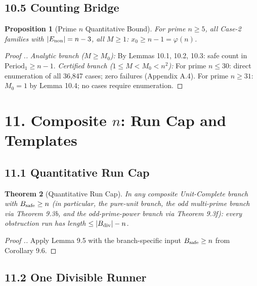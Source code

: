 \documentclass[11pt,a4paper]{article}
\theoremstyle{plain}
\newtheorem{theorem}{Theorem}[section]
\newtheorem{proposition}[theorem]{Proposition}
\theoremstyle{definition}
\theoremstyle{remark}
\begin{document}
\subsection{10.5 Counting Bridge}



\begin{proposition}[Prime $n$ Quantitative Bound]
For prime $n \geq 5$, all Case-2 families with $|E_{\rm non}|=n-3$, all $M \geq 1$: $x_0 \geq n-1 = \varphi(n)$.

\end{proposition}

\begin{proof}[Proof .]
\textit{Analytic branch ($M \geq M_0$):} By Lemmas 10.1, 10.2, 10.3: safe count in $\mathrm{Period}_1 \geq n-1$. \textit{Certified branch ($1 \leq M < M_0 < n^2$):} For prime $n \leq 30$: direct enumeration of all 36,847 cases; zero failures (Appendix A.4). For prime $n \geq 31$: $M_0 = 1$ by Lemma 10.4; no cases require enumeration.
\end{proof}


\medskip



\section{11. Composite $n$: Run Cap and Templates}



\subsection{11.1 Quantitative Run Cap}



\begin{theorem}[Quantitative Run Cap]
In any composite Unit-Complete branch with $B_{\rm safe} \geq n$ (in particular, the pure-unit branch, the odd multi-prime branch via Theorem 9.3b, and the odd-prime-power branch via Theorem 9.3f): every obstruction run has length $\leq |B_{\rm div}| - n$.

\end{theorem}

\begin{proof}[Proof .]
Apply Lemma 9.5 with the branch-specific input $B_{\rm safe} \geq n$ from Corollary 9.6.
\end{proof}


\subsection{11.2 One Divisible Runner}
\end{document}
